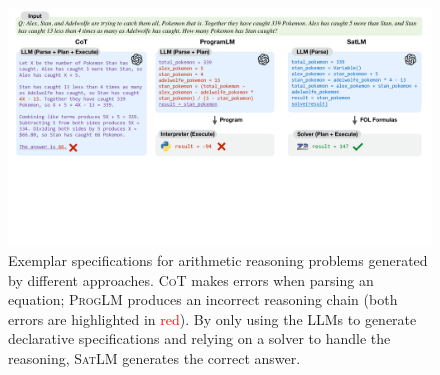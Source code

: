 \documentclass{article}
\theoremstyle{definition}
\newcommand\gd[1]{\todo[color=red!40]{{\bf Greg}: #1}}
\newcommand{\cotlm}{\textsc{CoT}}
\newcommand{\satlm}{\textsc{SatLM}}
\newcommand{\pallm}{\textsc{ProgLM}}
\begin{document}


\begin{figure}[t]
  \begin{center}
    \includegraphics[width=1.0\linewidth,trim=20 420 30 0,clip]{figures/exs_math.pdf}
  \end{center}
  \caption{Exemplar specifications for arithmetic reasoning problems generated by different approaches. \cotlm{} makes errors when parsing an equation; \pallm{} produces an incorrect reasoning chain (both errors are highlighted in \textcolor{red}{red}). By only using the LLMs to generate declarative specifications and relying on a solver to handle the reasoning, \satlm{} generates the correct answer.}
  \vspace{-0.5em}
  \label{fig:math_exs}
\end{figure}
\end{document}
